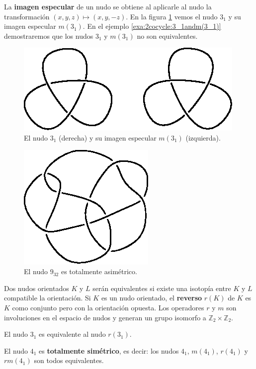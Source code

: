 \documentclass[graybox]{svmult}
\newcommand{\Z}{\mathbb{Z}}
\begin{document}
La \textbf{imagen especular} de un nudo se obtiene al aplicarle al nudo la
transformación $(x,y,z)\mapsto(x,y,-z)$.  En la figura
\ref{fig:trefoil_and_mirror} vemos el nudo $3_1$ y su imagen especular
$m(3_1)$. En el ejemplo \ref{exa:2cocycle:3_1andm(3_1)} demostraremos que los nudos
$3_1$ y $m(3_1)$ no son equivalentes. 
\begin{figure}[ht]
	\centering
		\includegraphics[scale=0.6]{images/trefoil_and_mirror}
		\caption{El nudo $3_1$ (derecha) y su imagen especular $m(3_1)$
		(izquierda).}
		\label{fig:trefoil_and_mirror}
\end{figure}
\begin{figure}[ht]
		\centering
		\includegraphics[scale=0.6]{images/9_32}
		\caption{El nudo $9_{32}$ es totalmente asimétrico.}
		\label{fig:9_32}
\end{figure}

Dos nudos orientados $K$ y $L$ serán equivalentes si existe una isotopía
entre $K$ y $L$ compatible la orientación.  Si $K$ es un nudo orientado, el
\textbf{reverso} $r(K)$ de $K$ es $K$ como conjunto pero con la orientación
opuesta. Los operadores $r$ y $m$ son involuciones en el espacio de nudos y
generan un grupo isomorfo a $\Z_2\times\Z_2$.

\begin{example}
	El nudo $3_1$ es equivalente al nudo $r(3_1)$. 
\end{example}

\begin{example}
	El nudo $4_1$ es
	\textbf{totalmente simétrico}, es decir: los nudos $4_1$, $m(4_1)$,
	$r(4_1)$ y $rm(4_1)$ son todos equivalentes.  
\end{example}
\end{document}
